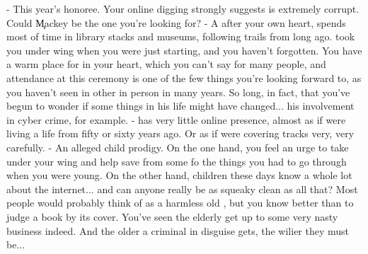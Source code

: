 \documentclass[char]{guildcamp4}
\begin{document}
\begin{contacts}
	\contact{\cMackey{}} - This year's honoree. Your online digging strongly suggests \cMackey{\they} is extremely corrupt. Could \c{Mackey{}}  be the one you're looking for?
	\contact{\cHistorian{}} - A  after your own heart, \cHistorian{} spends most of  time in library stacks and museums, following trails from long ago.  took you under  wing when you were just starting, and you haven't forgotten. You have a warm place for  in your heart, which you can't say for many people, and  attendance at this ceremony is one of the few things you're looking forward to, as you haven't seen in other in person in many years. So long, in fact, that you've begun to wonder if some things in his life might have changed... his involvement in cyber crime, for example.
	\contact{\cMarlowe{}} -  has very little online presence, almost as if  were living a life from fifty or sixty years ago. Or as if  were covering  tracks very, very carefully.
	\contact{\cEncyclopedia{}} - An alleged child prodigy. On the one hand, you feel an urge to take  under your wing and help save  from some fo the things you had to go through when you were young. On the other hand, children these days know a whole lot about the internet... and can anyone really be as squeaky clean as all that?
	\contact{\cTeaLady{}} Most people would probably think of  as a harmless old , but you know better than to judge a book by its cover. You've seen the elderly get up to some very nasty business indeed. And the older a criminal in disguise gets, the wilier they must be...
\end{contacts}
\end{document}

